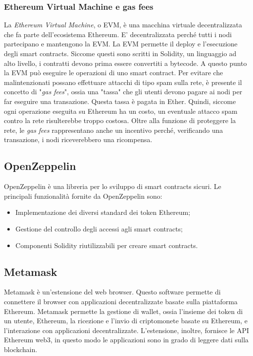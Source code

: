 \documentclass[a4paper]{article}
\begin{document}
    \subsubsection{Ethereum Virtual Machine e gas fees}
    La \emph{Ethereum Virtual Machine}, o EVM, è una macchina virtuale decentralizzata che fa parte dell'ecosistema Ethereum. E' decentralizzata perché tutti i nodi partecipano e mantengono la EVM.
    La EVM permette il deploy e l'esecuzione degli smart contracts. Siccome questi sono scritti in Solidity, un linguaggio ad alto livello, i contratti devono prima essere convertiti a bytecode. A questo punto
    la EVM può eseguire le operazioni di uno smart contract. Per evitare che malintenzionati possano effettuare attacchi di tipo spam sulla rete, è presente il concetto di "\emph{gas fees}", ossia una "tassa"
    che gli utenti devono pagare ai nodi per far eseguire una transazione. Questa tassa è pagata in Ether. Quindi, siccome ogni operazione eseguita su Ethereum ha un costo, un eventuale attacco spam contro la rete risulterebbe
    troppo costosa. Oltre alla funzione di proteggere la rete, le \emph{gas fees} rappresentano anche un incentivo perché, verificando una transazione, i nodi riceverebbero una ricompensa.

    \subsection{OpenZeppelin}
    OpenZeppelin è una libreria per lo sviluppo di smart contracts sicuri. Le principali funzionalità fornite da OpenZeppelin sono:
    \begin{itemize}
    \item Implementazione dei diversi standard dei token Ethereum;
    \item Gestione del controllo degli accessi agli smart contracts;
    \item Componenti Solidity riutilizzabili per creare smart contracts\cite{openzeppelin}.
    \end{itemize}

    \subsection{Metamask}
    Metamask è un'estensione del web browser. Questo software permette di connettere il browser con
    applicazioni decentralizzate basate sulla piattaforma Ethereum. Metamask permette la gestione di
    wallet, ossia l'insieme dei token di un utente, Ethereum, la ricezione e l'invio di criptomonete basate su Ethereum, e l'interazione con
    applicazioni decentralizzate. L'estensione, inoltre, fornisce le API Ethereum web3, in questo
    modo le applicazioni sono in grado di leggere dati sulla blockchain\cite{metamask}.
\end{document}
